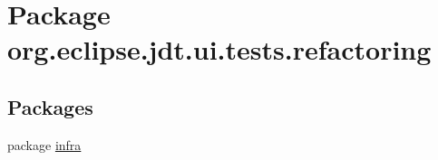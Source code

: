 \hypertarget{namespaceorg_1_1eclipse_1_1jdt_1_1ui_1_1tests_1_1refactoring}{
\section{Package org.eclipse.jdt.ui.tests.refactoring}
\label{namespaceorg_1_1eclipse_1_1jdt_1_1ui_1_1tests_1_1refactoring}
}
\subsection*{Packages}
\begin{DoxyCompactItemize}
\item 
package \hyperlink{namespaceorg_1_1eclipse_1_1jdt_1_1ui_1_1tests_1_1refactoring_1_1infra}{infra}
\end{DoxyCompactItemize}

